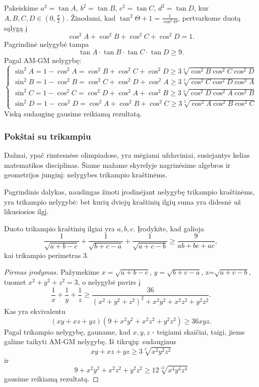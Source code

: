 \begin{sprendimas}
  Pakeiskime $a^2=\tan A$, $b^2=\tan B$, $c^2=\tan C$, $d^2= \tan D$, kur
  $A,B,C,D\in(0,\frac{\pi}{2}).$ Žinodami, kad
  $\tan^2\Theta+1=\frac{1}{\cos^2\Theta}$, pertvarkome duotą sąlygą į
  $$\cos^2A+\cos^2B+\cos^2C+\cos^2D=1.$$ Pagrindinė nelygybė tampa $$\tan
  A\cdot\tan B\cdot\tan C\cdot\tan D\geq9.$$ Pagal AM-GM nelygybę:
  $$\left\{
  \begin{array}{ll}
    \sin^2A=1-\cos^2A=\cos^2B+\cos^2C+\cos^2D\geq3\sqrt[3]{\cos^2B\cos^2C\cos^2D}\\
    \sin^2B=1-\cos^2B=\cos^2C+\cos^2D+\cos^2A\geq3\sqrt[3]{\cos^2C\cos^2D\cos^2A}\\
    \sin^2C=1-\cos^2C=\cos^2D+\cos^2A+\cos^2B\geq3\sqrt[3]{\cos^2D\cos^2A\cos^2B}\\
    \sin^2D=1-\cos^2D=\cos^2A+\cos^2B+\cos^2C\geq3\sqrt[3]{\cos^2A\cos^2B\cos^2C}
  \end{array}
  \right.$$
  Viską sudauginę gausime reikiamą rezultatą.
\end{sprendimas}

\subsubsection{Pokštai su trikampiu}

Dažnai, ypač rimtesnėse olimpiadose, yra mėgiami uždaviniai, susiejantys
kelias matematikos disciplinas. Šiame mažame skyrelyje nagrinėsime algebros
ir geometrijos junginį: nelygybes trikampio kraštinėms.

Pagrindinis dalykas, naudingas žinoti įrodinėjant nelygybę trikampio
kraštinėms, yra trikampio nelygybė: bet kurių dviejų kraštinių ilgių suma
yra didesnė už likusiosios ilgį.

\begin{pavnr}
  Duoto trikampio kraštinių ilgiai yra $a,b,c$. Įrodykite, kad galioja
  $$\frac{1}{\sqrt{a+b-c}}+\frac{1}{\sqrt{b+c-a}}+\frac{1}{\sqrt{a+c-b}}\geq\frac{9}{ab+bc+ac},$$
  kai trikampio perimetras 3.
\end{pavnr}

\begin{proof}[Pirmas įrodymas]
  Pažymekime $x=\sqrt{a+b-c}$, $y=\sqrt{b+c-a}$, z=$\sqrt{a+c-b}$, tuomet
  $x^2+y^2+z^2=3$, o nelygybė pavirs į
  \begin{equation*}\frac{1}{x}+\frac{1}{y}+\frac{1}{z}\geq\frac{36}{(x^2+y^2+z^2)^2+x^2y^2+x^2z^2+y^2z^2}.
    \tag{Įsitikinkite!}
  \end{equation*} Kas yra ekvivalentu
  $$(xy+xz+yz)(9+x^2y^2+x^2z^2+y^2z^2)\geq36xyz.$$ Pagal trikampio
  nelygybę, gauname, kad $x,y,z$ - teigiami skaičiai, taigi, jiems galime
  taikyti AM-GM nelygybę. Iš tikrųjų: sudauginus
  $$xy+xz+yz\geq3\sqrt[3]{x^2y^2z^2}$$ ir
  $$9+x^2y^2+x^2z^2+y^2z^2\geq12\sqrt[12]{x^4y^4z^4}$$ gausime reikiamą
  rezultatą.
\end{proof}

